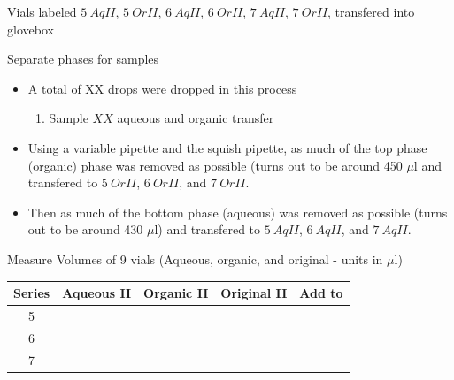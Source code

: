 \documentclass[idxtotoc,hyperref,openany,oneside]{labbook} %
\begin{document}
\begin{todolist}
\item{Vials labeled $\boxed{5\ AqII}$, 
  $\boxed{5\ OrII}$, $\boxed{6\ AqII}$, $\boxed{6\ OrII}$,
  $\boxed{7\ AqII}$, $\boxed{7\ OrII}$, transfered into
  glovebox}
\item{Separate phases for samples}
  \begin{itemize}
  \item{A total of XX drops were dropped in this process}
    \begin{enumerate}
    \item{Sample $\boxed{XX}$ aqueous and organic transfer}
    \end{enumerate}
  \item{Using a variable pipette and the squish pipette,
    as much of the top phase (organic) phase was removed as possible
    (turns out to be around 450 $\mu$l and transfered to
    $\boxed{5\ OrII}$, $\boxed{6\ OrII}$, and $\boxed{7\ OrII}$.}
  \item{Then as much of the bottom phase (aqueous) was removed as
    possible (turns out to be around 430 $\mu$l) and transfered
    to $\boxed{5\ AqII}$, $\boxed{6\ AqII}$, and $\boxed{7\ AqII}$.}
  \end{itemize}
\item{Measure Volumes of 9 vials (Aqueous, organic, and original
  - units in $\mu$l)}
\end{todolist}
\begin{center}
  \begin{tabular}{||c c c c c||}
    \hline
    Series & Aqueous II & Organic II & Original II & Add to\\ [0.5ex]
    \hline\hline
    5 & \hspace{1.5cm} & \hspace{1.5cm} & \hspace{1.5cm} & \hspace{1.5cm}\\
    \hline
    6 & \hspace{1.5cm} & \hspace{1.5cm} & \hspace{1.5cm} & \hspace{1.5cm}\\
    \hline
    7 & \hspace{1.5cm} & \hspace{1.5cm} & \hspace{1.5cm} & \hspace{1.5cm}\\
    \hline
  \end{tabular}
\end{center}
\end{document}
